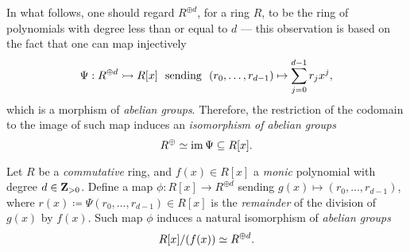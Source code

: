 In what follows, one should regard \(R^{\oplus d}\), for a ring \(R\), to be the
ring of polynomials with degree less than or equal to \(d\) --- this observation
is based on the fact that one can map injectively
\begin{equation}\label{eq:embedding-Rd-in-R[x]}
    \Psi: R^{\oplus d} \rightarrowtail R[x]\ \text{ sending }\
    (r_0, \dots, r_{d-1}) \mapsto \sum_{j=0}^{d-1} r_j x^j,
\end{equation}
which is a morphism of \emph{abelian groups}. Therefore, the restriction of the
codomain to the image of such map induces an \emph{isomorphism of abelian
    groups}
\begin{equation}\label{eq:iso-Rd-in-R[x]}
    R^{\oplus} \simeq \operatorname{im} \Psi \subseteq R[x].
\end{equation}

\begin{proposition}
    \label{prop:isomorphism-ring-quotient-by-monic-degree-d}
    Let \(R\) be a \emph{commutative} ring, and \(f(x) \in R[x]\) a \emph{monic}
    polynomial with degree \(d \in \mathbf{Z}_{> 0}\). Define a map
    \(\phi: R[x] \to R^{\oplus d}\) sending \(g(x) \mapsto (r_0, \dots, r_{d-1})\),
    where \(r(x) \coloneq \Psi(r_0, \dots, r_{d-1}) \in R[x]\) is the
    \emph{remainder} of the division of \(g(x)\) by \(f(x)\). Such map \(\phi\)
    induces a natural isomorphism of \emph{abelian groups}
    \[
        R[x]/(f(x)) \simeq R^{\oplus d}.
    \]
\end{proposition}

